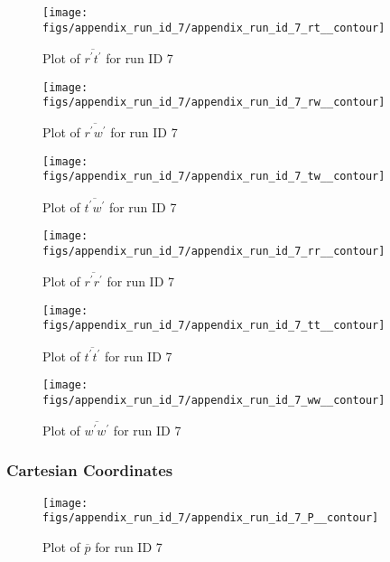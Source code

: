 \begin{figure}[H]
\centering
\texttt{[image: figs/appendix\_run\_id\_7/appendix\_run\_id\_7\_rt\_\_contour]}
\caption{Plot of $\overline{r^\prime t^\prime}$ for run ID 7}
\label{fig:appendix_run_id_7_rt__contour}
\end{figure}


\begin{figure}[H]
\centering
\texttt{[image: figs/appendix\_run\_id\_7/appendix\_run\_id\_7\_rw\_\_contour]}
\caption{Plot of $\overline{r^\prime w^\prime}$ for run ID 7}
\label{fig:appendix_run_id_7_rw__contour}
\end{figure}


\begin{figure}[H]
\centering
\texttt{[image: figs/appendix\_run\_id\_7/appendix\_run\_id\_7\_tw\_\_contour]}
\caption{Plot of $\overline{t^\prime w^\prime}$ for run ID 7}
\label{fig:appendix_run_id_7_tw__contour}
\end{figure}


\begin{figure}[H]
\centering
\texttt{[image: figs/appendix\_run\_id\_7/appendix\_run\_id\_7\_rr\_\_contour]}
\caption{Plot of $\overline{r^\prime r^\prime}$ for run ID 7}
\label{fig:appendix_run_id_7_rr__contour}
\end{figure}


\begin{figure}[H]
\centering
\texttt{[image: figs/appendix\_run\_id\_7/appendix\_run\_id\_7\_tt\_\_contour]}
\caption{Plot of $\overline{t^\prime t^\prime}$ for run ID 7}
\label{fig:appendix_run_id_7_tt__contour}
\end{figure}


\begin{figure}[H]
\centering
\texttt{[image: figs/appendix\_run\_id\_7/appendix\_run\_id\_7\_ww\_\_contour]}
\caption{Plot of $\overline{w^\prime w^\prime}$ for run ID 7}
\label{fig:appendix_run_id_7_ww__contour}
\end{figure}


\subsubsection{Cartesian Coordinates}
\begin{figure}[H]
\centering
\texttt{[image: figs/appendix\_run\_id\_7/appendix\_run\_id\_7\_P\_\_contour]}
\caption{Plot of $\overline{p}$ for run ID 7}
\label{fig:appendix_run_id_7_P__contour}
\end{figure}


